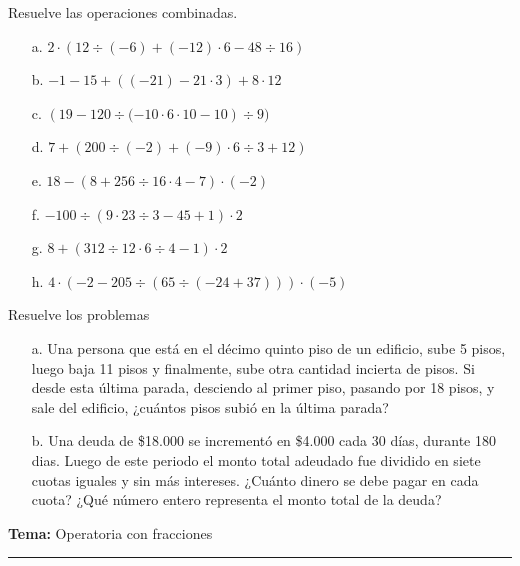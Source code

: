 \documentclass[spanish,letterpaper, 11pt, addpoints, answers]{exam}
\begin{document}
\begin{questions}
  \question Resuelve las operaciones combinadas.

  \begin{multicols}{2}
  \begin{itemize}
  \item[a.]$2\cdot \left( 12\div (-6)+(-12)\cdot 6-48\div 16\right)$
  \item[b.]$-1-15+\left((-21)-21\cdot 3\right) +8\cdot 12$
  \item[c.]$\left( 19-120\div (-10\cdot 6\cdot 10-10\right) \div 9)$
  \item[d.]$7+\left( 200\div (-2)+(-9)\cdot 6\div 3+12\right)$
  \item[e.]$18-\left( 8+256\div 16\cdot 4-7\right) \cdot(-2)$
  \item[f.] $-100\div \left( 9\cdot 23\div 3- 45+1\right) \cdot 2$
  \item[g.] $8 + \left( 312\div 12\cdot 6\div  4-1\right) \cdot 2$
  \item[h.] $4\cdot \left( -2-205\div \left(65\div \left(-24+37\right)\right)\right) \cdot (-5)$
  \end{itemize}

\end{multicols}

  \question Resuelve los problemas

  \begin{itemize}
  \item[a. ] Una persona que está en el décimo quinto piso de un edificio, sube 5 pisos, luego baja 11 pisos y finalmente, sube otra cantidad incierta de pisos. Si desde esta última parada, desciendo al primer piso, pasando por 18 pisos, y sale del edificio, ¿cuántos pisos subió en la última parada?
  \item[b. ] Una deuda de \$18.000 se incrementó en \$4.000 cada 30 días, durante 180 dias. Luego de este periodo el monto total adeudado fue dividido en siete cuotas iguales y sin más intereses. ¿Cuánto dinero se debe pagar en cada cuota? ¿Qué número entero representa el monto total de la deuda?
  \end{itemize}
  \newpage

  \parbox{6in}{
    \textbf{Tema:} Operatoria con fracciones}
    \vspace{0.15in}
    \hrule
    

\end{questions}
\end{document}

